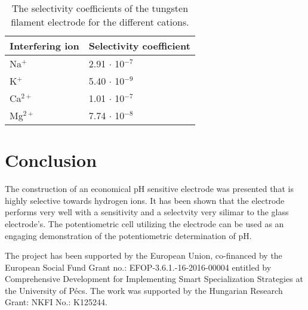 \documentclass[manuscript=article, journal=jceda8]{achemso}
\begin{document}
\begin{table}[]
\caption{The selectivity coefficients of the tungsten filament electrode for the different cations.}
\label{table:selectivity}
\begin{tabular}{ll}
Interfering ion & Selectivity coefficient \\
\hline
Na$^+$             & 2.91 $\cdot$ 10$^{-7}$              \\
K$^+$              & 5.40 $\cdot$ 10$^{-9}$              \\
Ca$^{2+}$            & 1.01 $\cdot$ 10$^{-7}$              \\
Mg$^{2+}$            & 7.74 $\cdot$ 10$^{-8}$            
\end{tabular}
\end{table}

\section{Conclusion}
	
The construction of an economical pH sensitive electrode was presented that is highly selective towards hydrogen ions. It has been shown that the electrode performs very well with a sensitivity and a selectvity very silimar to the glass electrode's.
The potentiometric cell utilizing the electrode can be used as an engaging demonstration of the potentiometric determination of pH. 




\begin{acknowledgement}
The project has been supported by the European Union, co-financed by the European Social Fund Grant no.: EFOP-3.6.1.-16-2016-00004 entitled by Comprehensive Development for Implementing Smart Specialization Strategies at the University of Pécs. The work was supported by the Hungarian Research Grant: NKFI No.: K125244.
\end{acknowledgement}


\end{document}
